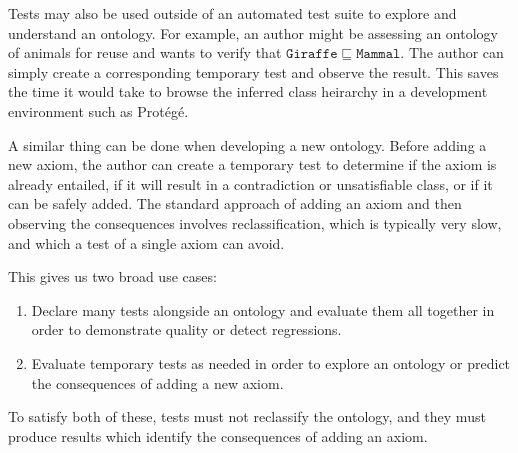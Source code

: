 \documentclass[paper.tex]{subfiles}
\begin{document}
Tests may also be used outside of an automated test suite to explore and understand an ontology.
For example, an author might be assessing an ontology of animals for reuse and wants to verify that $\mathtt{Giraffe} \sqsubseteq \mathtt{Mammal}$.
The author can simply create a corresponding temporary test and observe the result.
This saves the time it would take to browse the inferred class heirarchy in a development environment such as Prot\'eg\'e.

A similar thing can be done when developing a new ontology.
Before adding a new axiom, the author can create a temporary test to determine if the axiom is already entailed, if it will result in a contradiction or unsatisfiable class, or if it can be safely added.
The standard approach of adding an axiom and then observing the consequences involves reclassification, which is typically very slow, and which a test of a single axiom can avoid.

This gives us two broad use cases:
\begin{enumerate}[nosep]
  \item Declare many tests alongside an ontology and evaluate them all together in order to demonstrate quality or detect regressions.
  \item Evaluate temporary tests as needed in order to explore an ontology or predict the consequences of adding a new axiom.
\end{enumerate}

To satisfy both of these, tests must not reclassify the ontology, and they must produce results which identify the consequences of adding an axiom.
\end{document}
